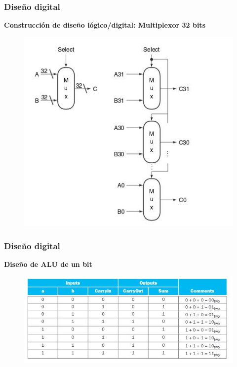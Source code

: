 \documentclass[aspectratio=169,compress]{beamer}
\begin{document}
\begin{footnotesize}
\begin{frame}[fragile]
\frametitle{Diseño digital}
\begin{center}\textbf{Construcción de diseño lógico/digital: Multiplexor 32 bits}\end{center}
\begin{figure}
\includegraphics[scale=0.4]{images/multiplexor32bits.jpg} 
\end{figure}
\end{frame}




\begin{frame}[fragile]
\frametitle{Diseño digital}
\begin{center}\textbf{Diseño de ALU de un bit}\end{center}
\begin{figure}
\includegraphics[scale=0.4]{images/alu1bit.jpg} 
\end{figure}
\end{frame}





\end{footnotesize}
\end{document}
